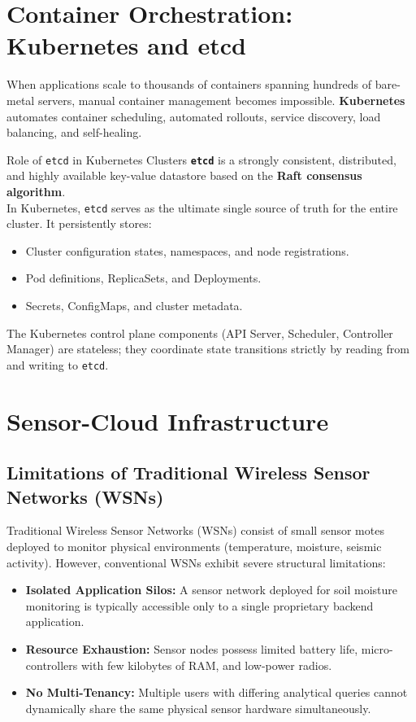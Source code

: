 \documentclass[11pt,a4paper,openany]{report}
\begin{document}
\section{Container Orchestration: Kubernetes and etcd}
When applications scale to thousands of containers spanning hundreds of bare-metal servers, manual container management becomes impossible. \textbf{Kubernetes} automates container scheduling, automated rollouts, service discovery, load balancing, and self-healing.

\begin{defbox}{Role of \texttt{etcd} in Kubernetes Clusters}
\textbf{\texttt{etcd}} is a strongly consistent, distributed, and highly available key-value datastore based on the \textbf{Raft consensus algorithm}.\\
In Kubernetes, \texttt{etcd} serves as the ultimate single source of truth for the entire cluster. It persistently stores:
\begin{itemize}[leftmargin=*]
  \item Cluster configuration states, namespaces, and node registrations.
  \item Pod definitions, ReplicaSets, and Deployments.
  \item Secrets, ConfigMaps, and cluster metadata.
\end{itemize}
The Kubernetes control plane components (API Server, Scheduler, Controller Manager) are stateless; they coordinate state transitions strictly by reading from and writing to \texttt{etcd}.
\end{defbox}

\section{Sensor-Cloud Infrastructure}
\subsection{Limitations of Traditional Wireless Sensor Networks (WSNs)}
Traditional Wireless Sensor Networks (WSNs) consist of small sensor motes deployed to monitor physical environments (temperature, moisture, seismic activity). However, conventional WSNs exhibit severe structural limitations:
\begin{itemize}[leftmargin=*]
  \item \textbf{Isolated Application Silos:} A sensor network deployed for soil moisture monitoring is typically accessible only to a single proprietary backend application.
  \item \textbf{Resource Exhaustion:} Sensor nodes possess limited battery life, micro-controllers with few kilobytes of RAM, and low-power radios.
  \item \textbf{No Multi-Tenancy:} Multiple users with differing analytical queries cannot dynamically share the same physical sensor hardware simultaneously.
\end{itemize}
\end{document}
